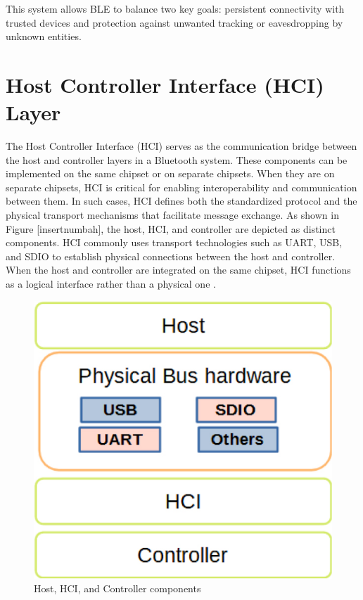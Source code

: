 This system allows BLE to balance two key goals: persistent connectivity with trusted devices and protection against unwanted tracking or eavesdropping by unknown entities.

\section{Host Controller Interface (HCI) Layer}

The Host Controller Interface (HCI) serves as the communication bridge between the host and controller layers in a Bluetooth system. These components can be implemented on the same chipset or on separate chipsets. When they are on separate chipsets, HCI is critical for enabling interoperability and communication between them. In such cases, HCI defines both the standardized protocol and the physical transport mechanisms that facilitate message exchange. As shown in Figure [insertnumbah], the host, HCI, and controller are depicted as distinct components. HCI commonly uses transport technologies such as UART, USB, and SDIO to establish physical connections between the host and controller. When the host and controller are integrated on the same chipset, HCI functions as a logical interface rather than a physical one \cite{introtoble}.

\begin{figure}[h]
    \caption{Host, HCI, and Controller components}
    \includegraphics{hosthcicontroller.png}
    \end{figure}

